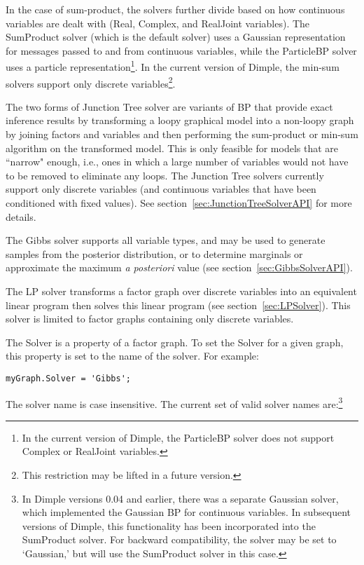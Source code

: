 In the case of sum-product, the solvers further divide based on how continuous variables are dealt with (Real, Complex, and RealJoint variables).  The SumProduct solver (which is the default solver) uses a Gaussian representation for messages passed to and from continuous variables, while the ParticleBP solver uses a particle representation\footnote{In the current version of Dimple, the ParticleBP solver does not support Complex or RealJoint variables.}.  In the current version of Dimple, the min-sum solvers support only discrete variables\footnote{This restriction may be lifted in a future version.}.

The two forms of Junction Tree solver are variants of BP that provide exact inference results by transforming a loopy graphical model into a non-loopy graph by joining factors and variables and then performing the sum-product or min-sum algorithm on the transformed model. This is only feasible for models that are ``narrow" enough, i.e., ones in which a large number of variables would not have to be removed to eliminate any loops. The Junction Tree solvers currently support only discrete variables (and continuous variables that have been conditioned with fixed values). See section~\ref{sec:JunctionTreeSolverAPI} for more details.

The Gibbs solver supports all variable types, and may be used to generate samples from the posterior distribution, or to determine marginals or approximate the maximum \emph{a posteriori} value (see section~\ref{sec:GibbsSolverAPI}).

The LP solver transforms a factor graph over discrete variables into an equivalent linear program then solves this linear program (see section~\ref{sec:LPSolver}).  This solver is limited to factor graphs containing only discrete variables.

The Solver is a property of a factor graph.  To set the Solver for a given graph, this property is set to the name of the solver.  For example:

\ifmatlab

\begin{lstlisting}
myGraph.Solver = 'Gibbs';
\end{lstlisting}

The solver name is case insensitive.  The current set of valid solver names are:\footnote{In Dimple versions 0.04 and earlier, there was a separate Gaussian solver, which implemented the Gaussian BP for continuous variables.  In subsequent versions of Dimple, this functionality has been incorporated into the SumProduct solver.  For backward compatibility, the solver may be set to `Gaussian,' but will use the SumProduct solver in this case.} 


